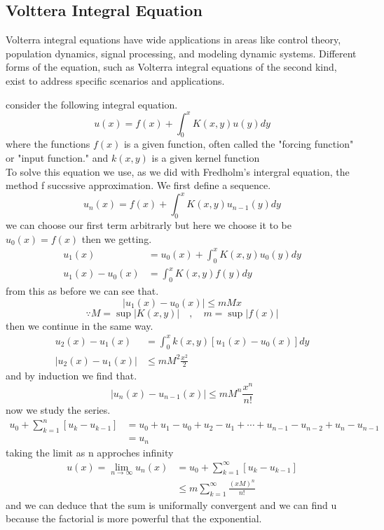 \documentclass[]{article}
\begin{document}
\subsection{Volttera Integral Equation}
Volterra integral equations have wide applications in areas like control theory, population dynamics, signal processing, and modeling dynamic systems. Different forms of the equation, such as Volterra integral equations of the second kind, exist to address specific scenarios and applications.
\par 
consider the following  integral equation.
\[
u(x) = f(x) + \int_{0}^{x} K(x,y) u(y)dy
\]
where the functions $f(x)$ is a given function, often called the "forcing function" or "input function."
and $k(x,y)$ is a given kernel function
\\
To solve this equation we use, as we did with Fredholm's intergral equation, the method f succssive approximation. We first define a sequence.
\[
u_n(x) = f(x) + \int_{0}^{x} K(x,y) u_{n-1}(y)dy    
\]
we can choose our first term arbitrarly but here we choose it to be $u_0(x) = f(x)$ then we getting.
\begin{align*}
u_1(x) &= u_0(x) + \int_{0}^{x} K(x,y) u_0(y)dy
\\
u_1(x) - u_0(x) &= \int_{0}^{x} K(x,y) f(y)dy
\end{align*}
from this as before we can see that.
\[
|u_1(x) - u_0(x)| \leq mMx
\]
\[
\because M=\sup|K(x,y)| \quad , \quad m=\sup |f(x)|        
\]
then we continue in the same way.
\begin{align*}
u_2(x) - u_1(x) &= \int_{0}^{x} k(x,y) [u_1(x) - u_0(x)] dy
\\
|u_2(x) - u_1(x)| &\leq mM^2\frac{x^2}{2}
\end{align*}
and by induction we find that.
\[
|u_n(x) - u_{n-1}(x)| \leq mM^n\frac{x^n}{n!}    
\]
now we study the series.
\begin{align*}
u_0 + \sum_{k=1}^{n} [u_k-u_{k-1}] &= u_0 + u_1 - u_0 +u_2 - u_1 + \cdots +u_{n-1}-u_{n-2}+ u_n - u_{n-1} 
\\
&= u_n
\end{align*}
taking the limit as n approches infinity
\begin{align*}
u(x) = \lim_{n\to \infty} u_n(x) &= u_0 + \sum_{k=1}^{\infty} [u_k-u_{k-1}]    
\\
& \leq m\sum_{k=1}^{\infty} \frac{{(xM)}^n}{n!}
\end{align*}
and we can deduce that the sum is uniformally convergent and we can find u because the factorial is more powerful that the exponential.
\end{document}
